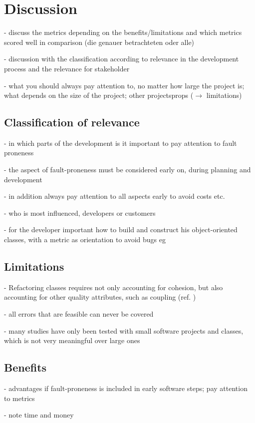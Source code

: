 \section{Discussion}

- discuss the metrics depending on the benefits/limitations and which metrics scored well in comparison (die genauer betrachteten oder alle)

- discussion with the classification according to relevance in the development process and the relevance for stakeholder

- what you should always pay attention to, no matter how large the project is; what depends on the size of the project; other projectsprops ($\rightarrow$ limitations)


\subsection{Classification of relevance}

- in which parts of the development is it important to pay attention to fault proneness

- the aspect of fault-proneness must be considered early on, during planning and development

- in addition always pay attention to all aspects early to avoid costs etc.

- who is most influenced, developers or customers

- for the developer important how to build and construct his object-oriented classes, with a metric as orientation to avoid bugs eg

\subsection{Limitations}

- Refactoring classes requires not only accounting for cohesion, but also accounting for other quality attributes, such as coupling (ref. \cite{b8al2012precise})

- all errors that are feasible can never be covered
 
- many studies have only been tested with small software projects and classes, which is not very meaningful over large ones

\subsection{Benefits}

- advantages if fault-proneness is included in early software steps; pay attention to metrics

- note time and money
